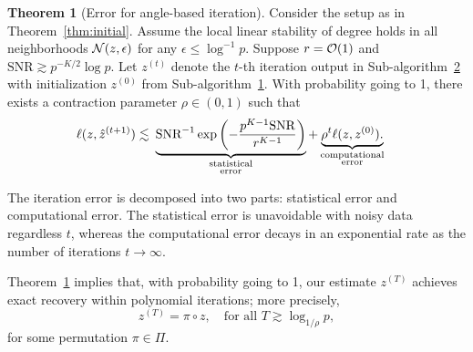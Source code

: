 \documentclass[lettersize,journal]{IEEEtran}
\theoremstyle{definition}
\newtheorem{thm}{Theorem}
\theoremstyle{definition}
\newcommand{\of}[1]{\left(#1\right)}
\newcommand*{\KeepStyleUnderBrace}[1]{%
  \mathop{%
    \mathchoice
    {\underbrace{\displaystyle#1}}%
    {\underbrace{\textstyle#1}}%
    {\underbrace{\scriptstyle#1}}%
    {\underbrace{\scriptscriptstyle#1}}%
  }\limits
}
\begin{document}
\begin{thm}[Error for angle-based iteration]\label{thm:refinement} Consider the setup as in Theorem~\ref{thm:initial}. Assume the local linear stability of degree holds in all neighborhoods $\mathcal{N}(z,\epsilon)$ for any $\epsilon \leq \log^{-1}p$. Suppose 
$r=\mathcal{O}(1)$ and $\text{SNR} \gtrsim  p^{-K/2}\log p$. Let $z^{(t)}$ denote the $t$-th iteration output in Sub-algorithm~\hyperref[alg:main]{2} with initialization $z^{(0)}$ from Sub-algorithm~\hyperref[alg:main]{1}. With probability going to 1, there exists a contraction parameter $\rho \in (0,1)$ such that 
\begin{align}\label{eq:final}
    \ell(z, \hat z^{(t+1)}) \lesssim &\ \KeepStyleUnderBrace{
   \text{SNR}^{-1}
    \exp\of{- \frac{p^{K-1}\text{SNR}}{r^{K-1}}}}_{\substack{\text{statistical}\\ \text{error}} }+ \KeepStyleUnderBrace{ \rho^t \ell(z, z^{(0)}). }_{\substack{\text{computational}\\ \text{error}}}
\end{align}
\end{thm}
The iteration error is decomposed into two parts: statistical error and computational error. The statistical error is unavoidable with noisy data regardless $t$, whereas the computational error decays in an exponential rate as the number of iterations $t \rightarrow \infty$. 

Theorem~\ref{thm:refinement} implies that, with probability going to 1, our estimate $z^{(T)}$ achieves exact recovery within polynomial iterations; more precisely,
\begin{equation}
     z^{(T)} = \pi \circ z, \quad \text{for all }T\gtrsim \log_{1/\rho} p,
\end{equation}
for some permutation $\pi \in \Pi$.
\end{document}
